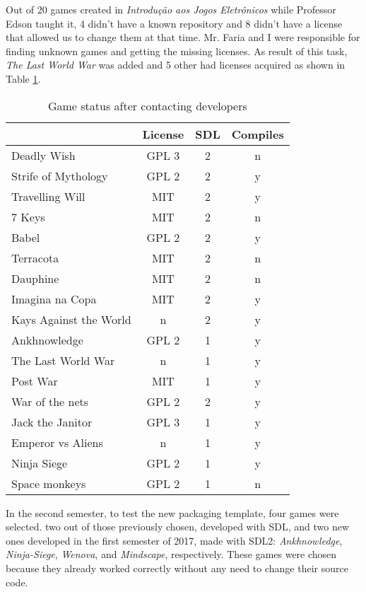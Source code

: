Out of 20 games created in \textit{Introdu\c{c}\~ao aos Jogos Eletr\^onicos} while Professor Edson taught it, 4 didn't have a known repository and 8 didn't have a license that allowed us to change them at that time. Mr. Faria and I were responsible for finding unknown games and getting the missing licenses. As result of this task, \textit{The Last World War} was added and 5 other had licenses acquired as shown in Table \ref{tab:final_games}.

\begin{table}[h!]
\centering
\caption{Game status after contacting developers}
\label{tab:final_games}
\begin{tabular}{lccc}
\toprule
\textbf{} & \multicolumn{1}{l}{\textbf{License}} & \multicolumn{1}{l}{\textbf{SDL}} & \multicolumn{1}{l}{\textbf{Compiles}} \\
\midrule
Deadly Wish & GPL 3 & 2 & n \\
Strife of Mythology & GPL 2 & 2 & y \\
Travelling Will & MIT & 2 & y \\
7 Keys & MIT & 2 & n \\
Babel & GPL 2 & 2 & y \\
Terracota & MIT & 2 & n \\
Dauphine & MIT & 2 & n \\
Imagina na Copa & MIT & 2 & y \\
Kays Against the World & n & 2 & y \\
Ankhnowledge & GPL 2 & 1 & y \\
The Last World War & n & 1 & y \\
Post War & MIT & 1 & y \\
War of the nets & GPL 2 & 2 & y \\
Jack the Janitor & GPL 3 & 1 & y \\
Emperor vs Aliens & n & 1 & y \\
Ninja Siege & GPL 2 & 1 & y \\
Space monkeys & GPL 2 & 1 & n \\
\bottomrule
\end{tabular}
\end{table}

In the second semester, to test the new packaging template, four games were selected. two out of those previously chosen, developed with SDL, and two new ones developed in the first semester of 2017, made with SDL2: \textit{Ankhnowledge}, \textit{Ninja-Siege}, \textit{Wenova}, and \textit{Mindscape}, respectively. These games were chosen because they already worked correctly without any need to change their source code.

